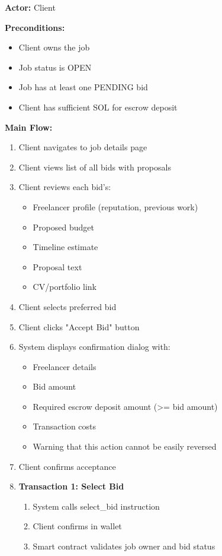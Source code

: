 \documentclass[a4paper,13pt,twoside]{report}
\theoremstyle{definition}
\begin{document}
\textbf{Actor:} Client

\textbf{Preconditions:}
\begin{itemize}
    \item Client owns the job
    \item Job status is OPEN
    \item Job has at least one PENDING bid
    \item Client has sufficient SOL for escrow deposit
\end{itemize}

\textbf{Main Flow:}
\begin{enumerate}
    \item Client navigates to job details page
    \item Client views list of all bids with proposals
    \item Client reviews each bid's:
    \begin{itemize}
        \item Freelancer profile (reputation, previous work)
        \item Proposed budget
        \item Timeline estimate
        \item Proposal text
        \item CV/portfolio link
    \end{itemize}
    \item Client selects preferred bid
    \item Client clicks "Accept Bid" button
    \item System displays confirmation dialog with:
    \begin{itemize}
        \item Freelancer details
        \item Bid amount
        \item Required escrow deposit amount (>= bid amount)
        \item Transaction costs
        \item Warning that this action cannot be easily reversed
    \end{itemize}
    \item Client confirms acceptance
    \item \textbf{Transaction 1: Select Bid}
    \begin{enumerate}
        \item System calls select\_bid instruction
        \item Client confirms in wallet
        \item Smart contract validates job owner and bid status

\end{enumerate}
\end{enumerate}
\end{document}
